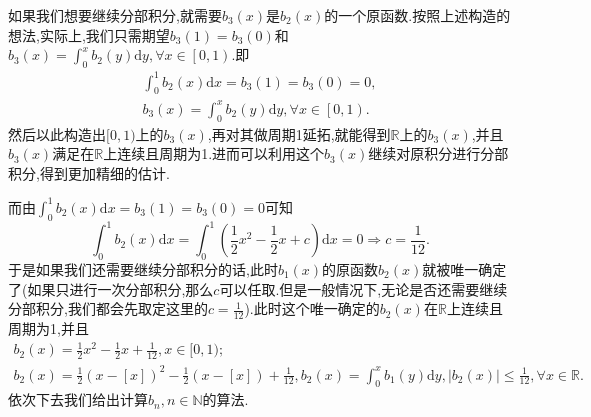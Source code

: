 \documentclass[../../main.tex]{subfiles}%
\begin{document}
\begin{remark}
如果我们想要继续分部积分,就需要$b_3(x)$是$b_2(x)$的一个原函数.按照上述构造的想法,实际上,我们只需期望\(b_3(1)=b_3(0)\)和$b_3(x)=\int_0^x{b_2\left( y \right) \mathrm{d}y},\forall x\in \left[ 0,1 \right) $.即
\begin{gather*}
\int_{0}^{1}b_2(x)\mathrm{d}x =b_3(1)=b_3(0)= 0,
\\
b_3(x)=\int_0^x{b_2\left( y \right) \mathrm{d}y},\forall x\in \left[ 0,1 \right).
\end{gather*}
然后以此构造出$[0,1)$上的$b_3(x)$,再对其做周期1延拓,就能得到$\mathbb{R}$上的$b_3(x)$,并且$b_3(x)$满足在$\mathbb{R}$上连续且周期为1.进而可以利用这个$b_3(x)$继续对原积分进行分部积分,得到更加精细的估计.

而由\(\int_{0}^{1}b_2(x)\mathrm{d}x =b_3(1)=b_3(0)= 0\)可知
\[
\int_{0}^{1}b_2(x)\mathrm{d}x=\int_{0}^{1}\left(\frac{1}{2}x^2-\frac{1}{2}x + c\right)\mathrm{d}x = 0\Rightarrow c=\frac{1}{12}.
\]
于是如果我们还需要继续分部积分的话,此时$b_1(x)$的原函数\(b_2(x)\)就被唯一确定了(如果只进行一次分部积分,那么$c$可以任取.但是一般情况下,无论是否还需要继续分部积分,我们都会先取定这里的$c=\frac{1}{12}$).此时这个唯一确定的$b_2(x)$在$\mathbb{R}$上连续且周期为1,\hypertarget{b2性质}{并且}
\begin{gather*}
b_2(x)=\frac{1}{2}x^2-\frac{1}{2}x + \frac{1}{12},x\in[0,1);
\\
b_2(x)=\frac{1}{2}\left( x-\left[ x \right] \right) ^2-\frac{1}{2}\left( x-\left[ x \right] \right) +\frac{1}{12},b_2\left( x \right) =\int_0^x{b_1\left( y \right) \mathrm{d}y},\left| b_2\left( x \right) \right|\leqslant \frac{1}{12},\forall x\in \mathbb{R}.
\end{gather*}
依次下去我们给出计算\(b_n,n\in\mathbb{N}\)的算法.
\end{remark}
\end{document}
